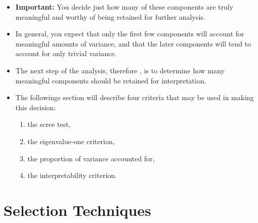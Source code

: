 \documentclass[a4paper,12pt]{article}
\begin{document}
\begin{itemize}
	\item 

\textbf{Important:} You decide just how many of these components are truly
meaningful and worthy of being retained for further analysis.


\item In general, you expect
that only the first few components will account for meaningful amounts of variance, and that the
later components will tend to account for only trivial variance.


\item The next step of the analysis, therefore , is to determine how many meaningful components should be retained for
interpretation.  


\item The followings section will describe four criteria that may be used in making this decision:
\begin{enumerate} 
	\item the scree test,
	\item the eigenvalue-one criterion,  
	\item the proportion of variance accounted for, 
	\item the interpretability criterion.
\end{enumerate}
\end{itemize}

\section{Selection Techniques}
\end{document}
